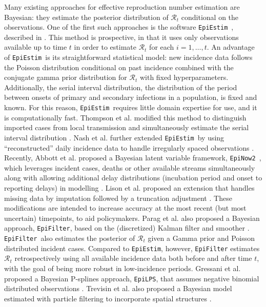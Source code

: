 \documentclass[10pt,letterpaper]{article}
\def\EpiEstim{\texttt{EpiEstim}}
\def\EpiLPS{\texttt{EpiLPS}}
\def\EpiFilter{\texttt{EpiFilter}}
\def\EpiNow2{\texttt{EpiNow2}}
\def\calR{\mathcal{R}}
\newcommand{\citep}[1]{\cite{#1}}
\begin{document}
Many existing approaches for effective reproduction number estimation are
Bayesian: they estimate the posterior distribution of $\calR_t$ conditional on
the observations. One of the first such approaches is the software \EpiEstim\
\citep{cori2020package}, described in \cite{cori2013new}. This method is
prospective, in that it uses only observations available up to time $t$ in order
to estimate $\calR_t$ for each $i = 1,\ldots, t$. An advantage of \EpiEstim\ is
its straightforward statistical model: new incidence data follows the Poisson
distribution conditional on past incidence combined with the conjugate gamma
prior distribution for $\calR_t$ with fixed hyperparameters. Additionally, the
serial interval distribution, the distribution of the period between onsets of
primary and secondary infections in a population, is fixed and known. For this
reason, \EpiEstim\ requires little domain expertise for use, and it is
computationally fast. Thompson et al. modified this method to
distinguish imported cases from local transmission and simultaneously estimate
the serial interval distribution \citep{thompson2019improved}. Nash et al. further extended
\EpiEstim\ by using ``reconstructed'' daily incidence data to handle irregularly
spaced observations \citep{nash2023estimating}. Recently, Abbott et al. proposed a Bayesian
latent variable framework, \EpiNow2\ \citep{EpiNow2}, which leverages
incident cases, deaths or other available streams simultaneously along with
allowing additional delay distributions (incubation period and onset to
reporting delays) in modelling \citep{abbott2020estimating}.  
Lison et al. proposed an extension that handles missing data by
imputation followed by a truncation adjustment \citep{lison2024generative}. 
These modifications are intended
to increase accuracy at the most recent (but most uncertain) timepoints, to aid 
policymakers. Parag et al. also proposed a Bayesian approach, 
\EpiFilter, based on the (discretized) Kalman filter and smoother \citep{parag2021improved}. 
\EpiFilter\ also estimates the posterior of $\calR_t$ given a Gamma 
prior and Poisson distributed incident cases. Compared to \EpiEstim, 
however, \texttt{EpiFilter} estimates $\calR_t$ retrospectively using all 
available incidence data both before and after time $t$, with the goal of being 
more robust in low-incidence periods. Gressani et al. proposed a 
Bayesian P-splines approach, \EpiLPS, that assumes negative binomial distributed 
observations \citep{gressani2022epilps}. Trevisin et al. also proposed a Bayesian model estimated 
with particle filtering to incorporate spatial structures \cite{trevisin2023spatially}. 
\end{document}
